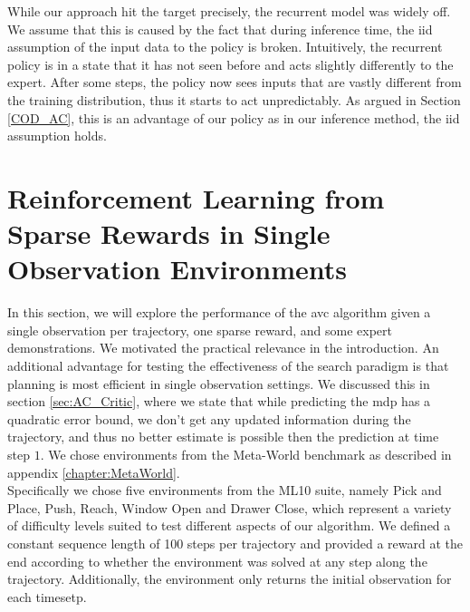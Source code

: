 While our approach hit the target precisely, the recurrent model was widely off. We assume that this is caused by the fact that during inference 
time, the
\ac{iid} assumption of the input data to the policy is broken. Intuitively, the recurrent policy
is in a state that it has not seen before and acts slightly differently to the expert. After some steps, the policy now sees 
inputs that are vastly
different from the training distribution, thus it starts to act unpredictably. As argued in Section \ref{COD_AC}, this is an advantage of our 
policy as in our inference method, the \ac{iid} assumption holds.

\section{Reinforcement Learning from Sparse Rewards in Single Observation Environments}
In this section, we will explore the performance of the \ac{avc} algorithm given a single observation per trajectory, one sparse reward, and some expert demonstrations.
We motivated the practical relevance in the introduction. An additional advantage for testing the effectiveness of the search paradigm is that planning is most efficient in
single observation settings.
We discussed this in section \ref{sec:AC_Critic}, where we state that while predicting the \ac{mdp} has a quadratic error bound, we don't get any updated information
during the trajectory, and thus no better estimate is possible then the prediction at time step $1$. 
We chose environments from the Meta-World benchmark as described in appendix \ref{chapter:MetaWorld}. \\

Specifically we chose five environments from the ML10 suite, namely Pick and Place, Push, Reach, Window Open and Drawer Close, which represent a variety
of difficulty levels suited to test different aspects of our algorithm. We defined a constant sequence length of 100 steps per trajectory and provided
a reward at the end according to whether the environment was solved at any step along the trajectory. Additionally, the environment
only returns the initial observation for each timesetp.\\

